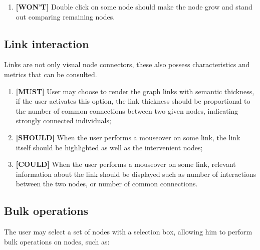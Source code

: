 \begin{enumerate}
    \begin{itemize}
        \item Opening the users' profile in the current \glspl{osn};
        \item Change the node symbol (e.g. if it is a circle the user might want to make the node a triangle instead). %
    \end{itemize}
    \item \textbf{[WON'T]} Double click on some node should make the node grow and stand out comparing remaining nodes. %
\end{enumerate}

\subsection{Link interaction}

Links are not only visual node connectors, these also possess characteristics and metrics that can be consulted.

\begin{enumerate}
    \item \textbf{[MUST]} User may choose to render the graph links with semantic thickness, if the user activates this option, the link thickness should be
    proportional to the number of common connections between two given nodes, indicating strongly connected individuals;
    \item \textbf{[SHOULD]} When the user performs a mouseover on some link, the link itself should be highlighted as well as the intervenient nodes;
    \item \textbf{[COULD]} When the user performs a mouseover on some link, relevant information about the link should be displayed such as number of interactions between the two nodes, or number of common connections.
\end{enumerate}

\subsection{Bulk operations}

The user may select a set of nodes with a selection box, allowing him to perform bulk operations on nodes, such as:

